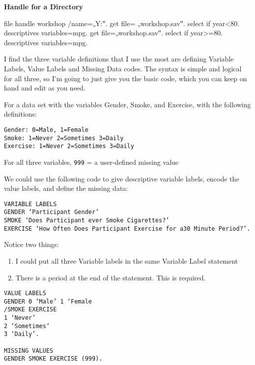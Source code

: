 \textbf{Handle for a Directory}

\begin{framed}
file handle workshop /name=„Y:\SPSS‟.
get file= „workshop\cars.sav‟.
select if year<80.
descriptives variables=mpg.
get file=„workshop\cars.sav‟.
select if year>=80.
descriptives variables=mpg.
\end{framed}
\newpage

I find the three variable definitions that I use the most are defining Variable Labels, Value Labels and Missing Data codes. The syntax is simple and logical for all three, so I’m going to just give you the basic code, which you can keep on hand and edit as you need.

For a data set with the variables Gender, Smoke, and Exercise, with the following definitions:

\begin{verbatim}
Gender: 0=Male, 1=Female
Smoke: 1=Never 2=Sometimes 3=Daily
Exercise: 1=Never 2=Sometimes 3=Daily
\end{verbatim}

For all three variables, \texttt{999} = a user-defined missing value

We could use the following code to give descriptive variable labels, encode the value labels, and define the missing data:
\begin{framed}
\begin{verbatim}
VARIABLE LABELS
GENDER ‘Participant Gender’
SMOKE ‘Does Participant ever Smoke Cigarettes?’
EXERCISE ‘How Often Does Participant Exercise for a30 Minute Period?’.
\end{verbatim}
\end{framed}

Notice two things:
\begin{enumerate}
\item I could put all three Variable labels in the same Variable Label statement
\item There is a period at the end of the statement. This is required.
\end{enumerate}

\begin{framed}
\begin{verbatim}
VALUE LABELS
GENDER 0 ‘Male’ 1 ‘Female
/SMOKE EXERCISE
1 ‘Never’
2 ‘Sometimes’
3 ‘Daily’.

MISSING VALUES
GENDER SMOKE EXERCISE (999).
\end{verbatim}
\end{framed}



